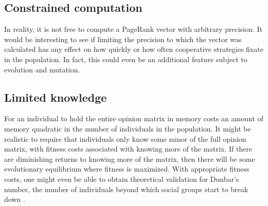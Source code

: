 \documentclass{amsart}
\begin{document}
\subsection{Constrained computation}

In reality, it is not free to compute a PageRank vector with arbitrary
precision. It would be interesting to see if limiting the precision to
which the vector was calculated has any effect on how quickly or how
often cooperative strategies fixate in the population. In fact, this
could even be an additional feature subject to evolution and mutation.

\subsection{Limited knowledge}

For an individual to hold the entire opinion matrix in memory costs an
amount of memory quadratic in the number of individuals in the
population. It might be realistic to require that individuals only
know some minor of the full opinion matrix, with fitness costs
associated with knowing more of the matrix. If there are diminishing
returns to knowing more of the matrix, then there will be some
evolutionary equilibrium where fitness is maximized. With appropriate
fitness costs, one might even be able to obtain theoretical validation
for Dunbar's number, the number of individuals beyond which social
groups start to break down \cite{dunbar_neocortex_1995}.

 
\end{document}
